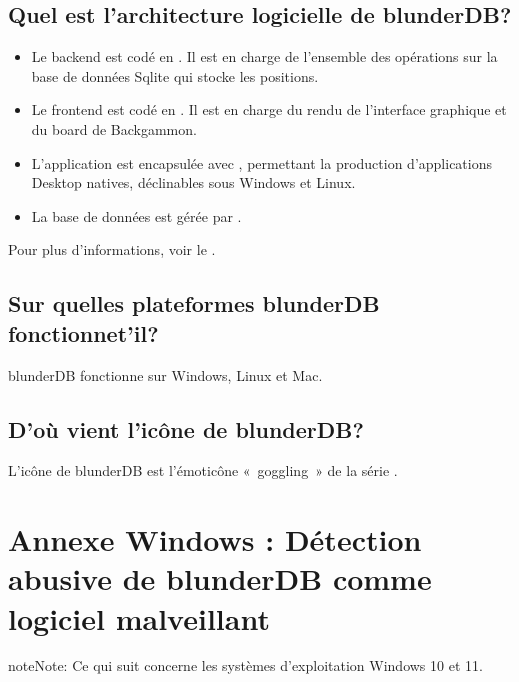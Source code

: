 \documentclass[letterpaper,10pt,french]{sphinxmanual}
\begin{document}
\subsection{Quel est l’architecture logicielle de blunderDB?}
\label{\detokenize{faq:quel-est-l-architecture-logicielle-de-blunderdb}}\begin{itemize}
\item {} 
\sphinxAtStartPar
Le backend est codé en . Il est en charge de
l’ensemble des opérations sur la base de données Sqlite qui stocke les
positions.

\item {} 
\sphinxAtStartPar
Le frontend est codé en . Il est en charge du
rendu de l’interface graphique et du board de Backgammon.

\item {} 
\sphinxAtStartPar
L’application est encapsulée avec , permettant la
production d’applications Desktop natives, déclinables sous Windows et Linux.

\item {} 
\sphinxAtStartPar
La base de données est gérée par .

\end{itemize}

\sphinxAtStartPar
Pour plus d’informations, voir le .


\subsection{Sur quelles plateformes blunderDB fonctionne\sphinxhyphen{}t’il?}
\label{\detokenize{faq:sur-quelles-plateformes-blunderdb-fonctionne-t-il}}
\sphinxAtStartPar
blunderDB fonctionne sur Windows, Linux et Mac.


\subsection{D’où vient l’icône de blunderDB?}
\label{\detokenize{faq:d-ou-vient-l-icone-de-blunderdb}}
\sphinxAtStartPar
L’icône de blunderDB est l’émoticône « goggling » de la série .

\sphinxstepscope


\section{Annexe Windows : Détection abusive de blunderDB comme logiciel malveillant}
\label{\detokenize{annexe_windows_securite:annexe-windows-detection-abusive-de-blunderdb-comme-logiciel-malveillant}}\label{\detokenize{annexe_windows_securite:annexe-windows-malware}}\label{\detokenize{annexe_windows_securite::doc}}
\begin{sphinxadmonition}{note}{Note:}
\sphinxAtStartPar
Ce qui suit concerne les systèmes d’exploitation Windows 10 et 11.
\end{sphinxadmonition}
\end{document}

